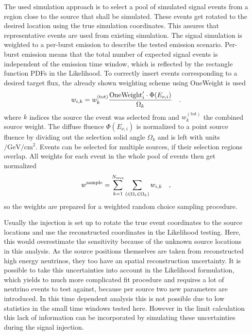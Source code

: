 The used simulation approach is to select a pool of simulated signal events from a region close to the source that shall be simulated.
These events get rotated to the desired location using the true simulation coordinates.
This assures that representative events are used from existing simulation.
The signal simulation is weighted to a per-burst emission to describe the tested emission scenario.
Per-burst emission means that the total number of expected signal events is independent of the emission time window, which is reflected by the rectangle function PDFs in the Likelihood.
To correctly insert events corresponding to a desired target flux, the already shown weighting scheme using OneWeight is used
\begin{equation}
  w_{i,k} = w_k^{(\text{tot})}\frac{\text{OneWeight}'_i \cdot \Phi(E_{\nu,i})}{\Omega_k}
  \quad\text{.}
\end{equation}
where $k$ indices the source the event was selected from and $w_k^{(\text{tot})}$ the combined source weight.
The diffuse fluence $\Phi(E_{\nu,i})$ is normalized to a point source fluence by dividing out the selection solid angle $\Omega_k$ and is left with units $\si{\per\GeV\per\cm\squared}$.
Events can be selected for multiple sources, if their selection regions overlap.
All weights for each event in the whole pool of events then get normalized
\begin{equation}
  w^\text{sample}
  = \sum_{k=1}^{N_\text{srcs}} \sum_{(i|\Omega_i \in \Omega_k)} w_{i,k}
  \quad\text{,}
\end{equation}
so the weights are prepared for a weighted random choice sampling procedure.

Usually the injection is set up to rotate the true event coordinates to the source locations and use the reconstructed coordinates in the Likelihood testing.
Here, this would overestimate the sensitivity because of the unknown source locations in this analysis.
As the source positions themselves are taken from reconstructed high energy neutrinos, they too have an spatial reconstruction uncertainty.
It is possible to take this uncertainties into account in the Likelihood formulation, which yields to much more complicated fit procedure and requires a lot of neutrino events to test against, because per source two new parameters are introduced.
In this time dependent analysis this is not possible due to low statistics in the small time windows tested here.
However in the limit calculation this lack of information can be incorporated by simulating these uncertainties during the signal injection.

